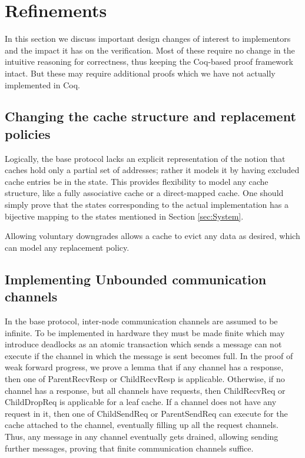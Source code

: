 \section{Refinements}
\label{sec:Refinements}

In this section we discuss important design changes of interest to implementors
and the impact it has on the verification. Most of these require no change in
the intuitive reasoning for correctness, thus keeping the Coq-based proof
framework intact. But these may require additional proofs which we have not
actually implemented in Coq.


\subsection{Changing the cache structure and replacement policies}

Logically, the base protocol lacks an explicit representation of the notion
that caches hold only a partial set of addresses; rather it models it by having
excluded cache entries be in the \In{} state. This provides
flexibility to model any cache structure, like a fully associative cache or a
direct-mapped cache. One should simply prove that the states corresponding to
the actual implementation has a bijective mapping to the states mentioned in
Section \ref{sec:System}.

Allowing voluntary downgrades allows a cache to evict any data as desired,
which can model any replacement policy.

\subsection{Implementing Unbounded communication channels}

In the base protocol, inter-node communication channels are assumed to be
infinite. To be implemented in hardware they must be made finite which may
introduce deadlocks as an atomic transaction which sends a message can not
execute if the channel in which the message is sent becomes full. In the proof
of weak forward progress, we prove a lemma that if any channel has a response,
then one of ParentRecvResp or ChildRecvResp is applicable. Otherwise, if no
channel has a response, but all channels have requests, then ChildRecvReq or
ChildDropReq is applicable for a leaf cache. If a channel does not have any
request in it, then one of ChildSendReq or ParentSendReq can execute for the
cache attached to the channel, eventually filling up all the request channels.
Thus, any message in any channel eventually gets drained, allowing sending
further messages, proving that finite communication channels suffice.


